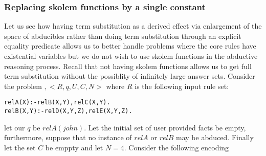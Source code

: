 \documentclass{article}
\begin{document}
\subsubsection{Replacing skolem functions by a single constant}
Let us see how having term substitution as a derived effect via enlargement of the space of abducibles rather than doing term substitution through an explicit equality predicate allows us to better handle problems where the core rules have existential variables but we do not wish to use skolem functions in the abductive reasoning process. Recall that not having skolem functions allows us to get full term substitution without the possiblity of infinitely large answer sets. Consider the problem $,<R,q,U,C,N>$ where $R$ is the following input rule set:
\begin{verbatim}
relA(X):-relB(X,Y),relC(X,Y).
relB(X,Y):-relD(X,Y,Z),relE(X,Y,Z).
\end{verbatim}
let our $q$ be $relA(john)$. Let the initial set of user provided facts be empty, furthermore, suppose that no instance of $relA$ or $relB$ may be abduced. Finally let the set $C$ be emppty and let $N=4$.  
Consider the following encoding
\end{document}
